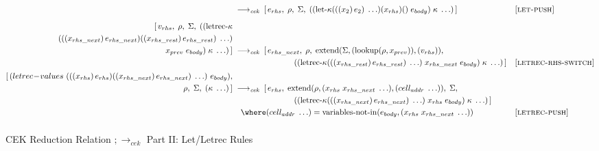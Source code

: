 \begin{figure}[!h]
{\begin{minipage}{\textwidth}
\begin{align*}
        &\;\longrightarrow_{\textit{cek}}\;
        [\,e_{rhs},\;\rho,\;\Sigma,\;((\operatorname{let-\kappa}(((x_2)\,e_2)\;\ldots)(x_{rhs})()\;e_{body})\;\kappa\;\ldots)\,]
        &&\textsc{[let‑push]}\\[6pt]
%
        [\,v_{rhs},\;\rho,\;\Sigma,\;((\operatorname{letrec-\kappa}\\(((x_{rhs\_next})\,e_{rhs\_next})((x_{rhs\_rest})\,e_{rhs\_rest})\;\ldots)\\
                                       x_{prev}\;e_{body})\;\kappa\;\ldots)\,]
        &\;\longrightarrow_{\textit{cek}}\;
        [\,e_{rhs\_next},\;\rho,\;\operatorname{extend}(\Sigma,(\operatorname{lookup}(\rho,x_{prev})),(v_{rhs})),\\
        &\hspace{7.6em}
          ((\operatorname{letrec-\kappa}(((x_{rhs\_rest})\,e_{rhs\_rest})\;\ldots)\;x_{rhs\_next}\;e_{body})\;\kappa\;\ldots)\,]
        &&\textsc{[letrec‑rhs‑switch]}\\[2pt]
%
        [\,(letrec\!-\!values\ (((x_{rhs})\,e_{rhs})((x_{rhs\_next})\,e_{rhs\_next})\;\ldots)\ e_{body}),\\ \rho,\;\Sigma,\;(\kappa\;\ldots)\,]
        &\;\longrightarrow_{\textit{cek}}\;
        [\,e_{rhs},\;
          \operatorname{extend}(\rho,(x_{rhs}\;x_{rhs\_next}\;\ldots),(cell_{addr}\;\ldots)),\;\Sigma,\\
        &\hspace{7.6em}
          ((\operatorname{letrec-\kappa}(((x_{rhs\_next})\,e_{rhs\_next})\;\ldots)\;x_{rhs}\;e_{body})\;\kappa\;\ldots)\,] \\
        &\hspace{1em}
          \where (cell_{addr}\;\ldots)=\operatorname{variables-not-in}(e_{body},(x_{rhs}\;x_{rhs\_next}\;\ldots))
        &&\textsc{[letrec‑push]}\\[6pt]
      \end{align*}
    \end{minipage}%
  }
  \vspace{0.6em}
  \caption{CEK Reduction Relation $;\longrightarrow_{\textit{cek}}$ Part II: Let/Letrec Rules}
  \label{fig:cek-reduction-relation-redacted-letrec}
\end{figure}
